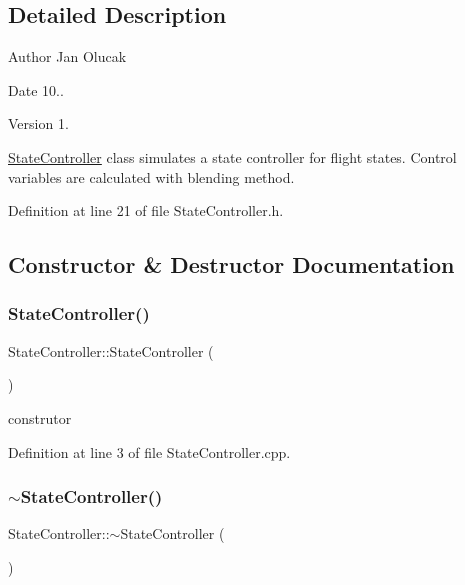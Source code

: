 \subsection{Detailed Description}
\begin{DoxyAuthor}{Author}
Jan Olucak 
\end{DoxyAuthor}
\begin{DoxyDate}{Date}
10.. 
\end{DoxyDate}
\begin{DoxyVersion}{Version}
1.
\end{DoxyVersion}
\hyperlink{class_state_controller}{State\+Controller} class simulates a state controller for flight states. Control variables are calculated with blending method. 

Definition at line 21 of file State\+Controller.\+h.



\subsection{Constructor \& Destructor Documentation}
\mbox{\label{class_state_controller_a4233a366a1e79c4a9c6ffd639f404ec1}} 
\subsubsection{\texorpdfstring{State\+Controller()}{StateController()}}
{\footnotesize\ttfamily State\+Controller\+::\+State\+Controller (\begin{DoxyParamCaption}{ }\end{DoxyParamCaption})}



construtor 



Definition at line 3 of file State\+Controller.\+cpp.

\mbox{\label{class_state_controller_af28a57ede7f1276025bebbaf400468f9}} 
\subsubsection{\texorpdfstring{$\sim$\+State\+Controller()}{~StateController()}}
{\footnotesize\ttfamily State\+Controller\+::$\sim$\+State\+Controller (\begin{DoxyParamCaption}{ }\end{DoxyParamCaption})}



